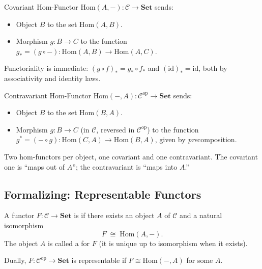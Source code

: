\begin{example}{Covariant Hom-Functor}
$\mathrm{Hom}(A, -) : \mathcal{C} \to \mathbf{Set}$ sends:
\begin{itemize}
  \item Object $B$ to the set $\mathrm{Hom}(A, B)$.
  \item Morphism $g : B \to C$ to the function
        $g_* = (g \circ -) : \mathrm{Hom}(A, B) \to \mathrm{Hom}(A, C)$.
\end{itemize}
Functoriality is immediate: $(g \circ f)_* = g_* \circ f_*$ and
$(\mathrm{id})_* = \mathrm{id}$, both by associativity and identity laws.
\end{example}

\begin{example}{Contravariant Hom-Functor}
$\mathrm{Hom}(-, A) : \mathcal{C}^{\mathrm{op}} \to \mathbf{Set}$ sends:
\begin{itemize}
  \item Object $B$ to the set $\mathrm{Hom}(B, A)$.
  \item Morphism $g : B \to C$ (in $\mathcal{C}$, reversed in
        $\mathcal{C}^{\mathrm{op}}$) to the function $g^* = (- \circ g)
        : \mathrm{Hom}(C, A) \to \mathrm{Hom}(B, A)$, given by
        \emph{pre}composition.
\end{itemize}
\end{example}

\begin{dialog}
Two hom-functors per object, one covariant and one contravariant. The
covariant one is ``maps out of $A$''; the contravariant is ``maps into
$A$.''
\end{dialog}

\subsection{Formalizing: Representable Functors}

A functor $F : \mathcal{C} \to \mathbf{Set}$ is  if
there exists an object $A$ of $\mathcal{C}$ and a natural isomorphism
\begin{equation*}
  F \;\cong\; \mathrm{Hom}(A, -).
\end{equation*}
The object $A$ is called a  for $F$ (it is
unique up to isomorphism when it exists).

Dually, $F : \mathcal{C}^{\mathrm{op}} \to \mathbf{Set}$ is representable
if $F \cong \mathrm{Hom}(-, A)$ for some $A$.

